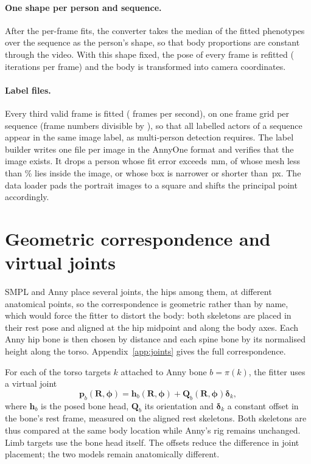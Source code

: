 \paragraph{One shape per person and sequence.} After the per-frame fits, the converter takes the median of the
fitted phenotypes over the sequence as the person's shape, so that body proportions are constant through the
video. With this shape fixed, the pose of every frame is refitted (\DataRefineIters{} iterations per frame) and the
body is transformed into camera coordinates.

\paragraph{Label files.} Every third valid frame is fitted (\DataLabelFps{} frames per second), on one frame grid per
sequence (frame numbers divisible by \DataFrameStride), so that all labelled actors of a sequence appear in the same
image label, as multi-person detection requires. The label builder writes one file per image in the AnnyOne format
and verifies that the image exists. It drops a person whose fit error exceeds \DataDropErr\,mm, of whose mesh less
than \DataDropVisPct\% lies inside the image, or whose box is narrower or shorter than \DataDropBox\,px. The data
loader pads the portrait images to a square and shifts the principal point accordingly.

\section{Geometric correspondence and virtual joints}
\label{sec:data-history}

SMPL and Anny place several joints, the hips among them, at different anatomical points, so the correspondence is
geometric rather than by name, which would force the fitter to distort the body: both skeletons are placed in their rest pose and aligned at the hip midpoint and along the body
axes. Each Anny hip bone is then chosen by distance and each spine bone by its normalised height along the torso.
Appendix~\ref{app:joints} gives the full correspondence.

For each of the \DataVirtualJoints{} torso targets $k$ attached to Anny bone $b=\pi(k)$, the fitter uses a virtual
joint
\begin{equation}
 \mathbf p_b(\mathbf R,\boldsymbol\phi)
   =\mathbf h_b(\mathbf R,\boldsymbol\phi)+\mathbf Q_b(\mathbf R,\boldsymbol\phi)\boldsymbol\delta_k ,
 \label{eq:virtual-joint}
\end{equation}
where $\mathbf h_b$ is the posed bone head, $\mathbf Q_b$ its orientation and $\boldsymbol\delta_k$ a constant offset
in the bone's rest frame, measured on the aligned rest skeletons. Both skeletons are thus compared at the same body location while Anny's rig
remains unchanged. Limb targets use the bone head itself. The offsets reduce the difference in joint placement; the two models
remain anatomically different.

